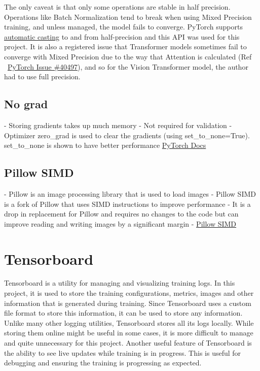 The only caveat is that only some operations are stable in half precision. Operations like Batch Normalization tend to break when using Mixed Precision training, and unless managed, the model fails to converge. PyTorch supports \href{https://pytorch.org/docs/stable/notes/amp_examples.html}{automatic casting} to and from half-precision and this API was used for this project. It is also a registered issue that Transformer models sometimes fail to converge with Mixed Precision due to the way that Attention is calculated (Ref ~\href{https://github.com/pytorch/pytorch/issues/40497}{PyTorch Issue \#40497}), and so for the Vision Transformer \cite{dosovitskiyImageWorth16x162021} model, the author had to use full precision.

\subsection{No grad}
- Storing gradients takes up much memory
- Not required for validation
- Optimizer zero\_grad is used to clear the gradients (using set\_to\_none=True). set\_to\_none is shown to have better performance \href{https://pytorch.org/tutorials/recipes/recipes/tuning_guide.html}{PyTorch Docs}

\subsection{Pillow SIMD}
- Pillow is an image processing library that is used to load images 
- Pillow SIMD is a fork of Pillow that uses SIMD instructions to improve performance
- It is a drop in replacement for Pillow and requires no changes to the code but can improve reading and writing images by a significant margin
- \href{https://github.com/uploadcare/pillow-simd}{Pillow SIMD}

\section{Tensorboard}
Tensorboard is a utility for managing and visualizing training logs. In this project, it is used to store the training configurations, metrics, images and other information that is generated during training. Since Tensorboard uses a custom file format to store this information, it can be used to store any information. Unlike many other logging utilities, Tensorboard stores all its logs locally. While storing them online might be useful in some cases, it is more difficult to manage and quite unnecessary for this project. 
Another useful feature of Tensorboard is the ability to see live updates while training is in progress. This is useful for debugging and ensuring the training is progressing as expected.

